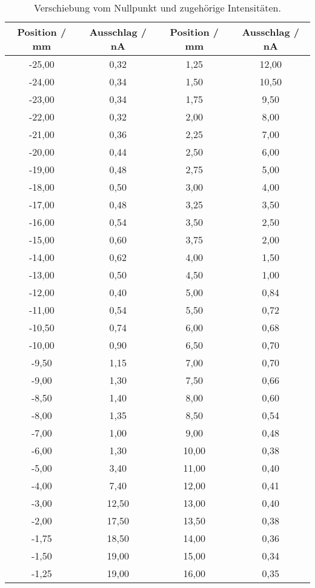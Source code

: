 \begin{table}[!htp]
\centering
\caption{Verschiebung vom Nullpunkt und zugehörige Intensitäten.}
\label{tab:spalt1}
\begin{tabular}{c c c c}
\toprule
{{Position / mm}} & {{Ausschlag / nA}} & {{Position / mm}} & {{Ausschlag / nA}} \\
\midrule
-25,00   & 0,32  & 1,25    & 12,00 \\
-24,00   & 0,34  &1,50     & 10,50 \\
-23,00   & 0,34  &1,75     & 9,50 \\
-22,00   & 0,32  &2,00     & 8,00 \\
-21,00   & 0,36  &2,25     & 7,00 \\
-20,00   & 0,44  &2,50     & 6,00 \\
-19,00   & 0,48  &2,75     & 5,00 \\
-18,00   & 0,50  &3,00     & 4,00 \\
-17,00   & 0,48  &3,25     & 3,50 \\
-16,00   & 0,54  &3,50     & 2,50 \\
-15,00   & 0,60  &3,75     & 2,00 \\
-14,00   & 0,62  &4,00     & 1,50 \\
-13,00   & 0,50  &4,50     & 1,00 \\
-12,00   & 0,40  &5,00     & 0,84 \\
-11,00   & 0,54  &5,50     & 0,72 \\
-10,50   & 0,74  &6,00     & 0,68 \\
-10,00   & 0,90  &6,50     & 0,70 \\
-9,50    & 1,15  &7,00     & 0,70 \\
-9,00    & 1,30  &7,50     & 0,66 \\
-8,50    & 1,40  &8,00     & 0,60 \\
-8,00    & 1,35  &8,50     & 0,54 \\
-7,00    & 1,00  &9,00     & 0,48 \\
-6,00    & 1,30  &10,00    & 0,38 \\
-5,00    & 3,40  &11,00    & 0,40 \\
-4,00    & 7,40  &12,00    & 0,41 \\
-3,00    & 12,50 &13,00    & 0,40 \\
-2,00    & 17,50 &13,50    & 0,38 \\
-1,75    & 18,50 &14,00    & 0,36 \\
-1,50    & 19,00 &15,00    & 0,34 \\
-1,25    & 19,00 &16,00    & 0,35 \\

\end{tabular}
\end{table}
